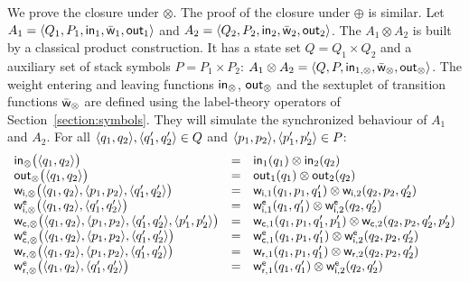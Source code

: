 %
%
We prove the closure under $\otimes$. 
The proof of the closure under $\oplus$ is similar.
%
Let $A_1 = \< Q_1, P_1, \init_1, \bar\wei_1, \final_1 >$
and $A_2 = \< Q_2, P_2, \init_2, \bar\wei_2, \final_2 >$.
The \SWVPA $A_1 \otimes A_2$ is built by a 
classical product construction.
%
It has a state set $Q = Q_1 \times Q_2$
and a auxiliary set of stack symbols $P = P_1 \times P_2$:
$A_1 \otimes A_2 = \< Q, P, \init_{1, \otimes}, 
         \bar\wei_{\otimes}, \final_{\otimes} >$.
The weight entering and leaving functions         
$\mathsf{in}_{\otimes}$, $\mathsf{out}_{\otimes}$
and the sextuplet of transition functions $\bar{\mathsf{w}}_{\otimes}$
are defined 
using the label-theory operators of Section~\ref{section:symbols}.
They will simulate the synchronized behaviour of $A_1$ and $A_2$.
%
For all $\< q_1, q_2>, \< q'_1, q'_2> \in Q$ 
and $\< p_1, p_2>, \< p'_1, p'_2> \in P$:
\[
\begin{array}{lcl}
\init_{\otimes}\bigl(\< q_1, q_2>\bigr) & = & \init_{1}(q_1) \otimes \init_{2}(q_2)\\
\final_{\otimes}\bigl(\< q_1, q_2>\bigr) & = & \final_{1}(q_1) \otimes \final_{2}(q_2)\\
%
\wei_{\mathsf{i}, \otimes}\bigl(\< q_1, q_2>, \<p_1, p_2>, \<q'_1, q'_2>\bigr) & = &
\wei_{\mathsf{i}, 1}(q_1, p_1, q'_1) \otimes \wei_{\mathsf{i}, 2}(q_2, p_2, q'_2)\\
%
\weie[\mathsf{i}, \otimes]\bigl(\< q_1, q_2>, \<q'_1, q'_2>\bigr) & = &
\weie[\mathsf{i}, 1](q_1, q'_1) \otimes \weie[\mathsf{i}, 2](q_2, q'_2)\\
%
\wei_{\mathsf{c}, \otimes}\bigl(\< q_1, q_2>, \<p_1, p_2>, \<q'_1, q'_2>, \<p'_1, p'_2>\bigr) & = &
\wei_{\mathsf{c}, 1}(q_1, p_1, q'_1, p'_1) \otimes \wei_{\mathsf{c}, 2}(q_2, p_2, q'_2, p'_2)\\
%
\weie[\mathsf{c}, \otimes]\bigl(\< q_1, q_2>, \<p_1, p_2>, \<q'_1, q'_2>\bigr) & = &
\weie[\mathsf{c}, 1](q_1, p_1, q'_1) \otimes \weie[\mathsf{i}, 2](q_2, p_2, q'_2)\\
%
\wei_{\mathsf{r}, \otimes}\bigl(\< q_1, q_2>, \<p_1, p_2>, \<q'_1, q'_2>\bigr) & = &
\wei_{\mathsf{r}, 1}(q_1, p_1, q'_1) \otimes \wei_{\mathsf{r}, 2}(q_2, p_2, q'_2)\\
%
\weie[\mathsf{r}, \otimes]\bigl(\< q_1, q_2>, \<q'_1, q'_2>\bigr) & = &
\weie[\mathsf{r}, 1](q_1, q'_1) \otimes \weie[\mathsf{i}, 2](q_2, q'_2)\\
\end{array}
\]






